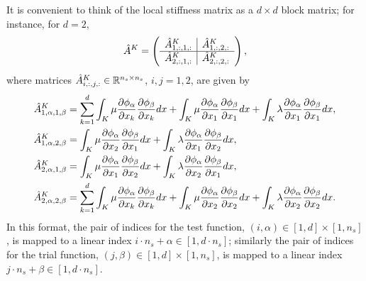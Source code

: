 It is convenient to think of the local stiffness matrix as a $d \times d$ block matrix; for instance, for $d = 2$,
\begin{equation*}
  \hat A^K = \bmat{c|c}
  \hat A^{K}_{1,:,1,:} &  \hat A^{K}_{1,:,2,:} \\
  \hline
  \hat A^{K}_{2,:,1,:} &  \hat A^{K}_{2,:,2,:}
  \emat,
\end{equation*}
where matrices $\hat A^K_{i,:,j,:} \in \RR^{n_s \times n_s}$, $i,j = 1,2$, are given by
\begin{align*}
  \hat A^K_{1,\alpha,1,\beta} &= \sum_{k=1}^d \int_K \mu \pp{\phi_\alpha}{x_k} \pp{\phi_\beta}{x_k} dx + \int_K \mu \pp{\phi_\alpha}{x_1} \pp{\phi_\beta}{x_1} dx + \int_K \lambda \pp{\phi_\alpha}{x_1} \pp{\phi_\beta}{x_1} dx, \\
  \hat A^K_{1,\alpha,2,\beta} &= \int_K \mu \pp{\phi_\alpha}{x_2} \pp{\phi_\beta}{x_1} dx + \int_K \lambda \pp{\phi_\alpha}{x_1} \pp{\phi_\beta}{x_2} dx, \\
  \hat A^K_{2,\alpha,1,\beta} &= \int_K \mu \pp{\phi_\alpha}{x_1} \pp{\phi_\beta}{x_2} dx + \int_K \lambda \pp{\phi_\alpha}{x_2} \pp{\phi_\beta}{x_1} dx, \\
  \hat A^K_{2,\alpha,2,\beta} &= \sum_{k=1}^d \int_K \mu \pp{\phi_\alpha}{x_k} \pp{\phi_\beta}{x_k} dx + \int_K \mu \pp{\phi_\alpha}{x_2} \pp{\phi_\beta}{x_2} dx + \int_K \lambda \pp{\phi_\alpha}{x_2} \pp{\phi_\beta}{x_2} dx.
\end{align*}
In this format, the pair of indices for the test function, $(i, \alpha)\in [1,d] \times [1,n_s]$, is mapped to a linear index $i \cdot n_s + \alpha \in [1,d\cdot n_s]$; similarly the pair of indices for the trial function, $(j,\beta)\in [1,d] \times [1,n_s]$, is mapped to a linear index $j \cdot n_s + \beta \in [1,d\cdot n_s]$.

